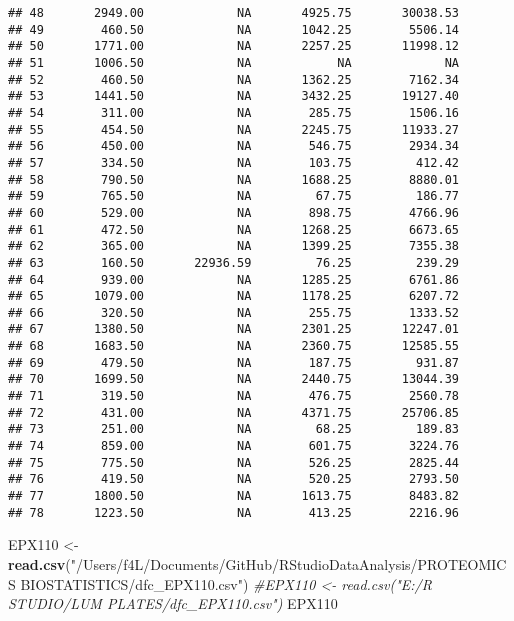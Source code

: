 \documentclass[]{article}
\newenvironment{Shaded}{\begin{snugshade}}{\end{snugshade}}
\newcommand{\CommentTok}[1]{\textcolor[rgb]{0.56,0.35,0.01}{\textit{#1}}}
\newcommand{\KeywordTok}[1]{\textcolor[rgb]{0.13,0.29,0.53}{\textbf{#1}}}
\newcommand{\NormalTok}[1]{#1}
\newcommand{\StringTok}[1]{\textcolor[rgb]{0.31,0.60,0.02}{#1}}
\begin{document}
\begin{verbatim}
## 48       2949.00             NA       4925.75       30038.53
## 49        460.50             NA       1042.25        5506.14
## 50       1771.00             NA       2257.25       11998.12
## 51       1006.50             NA            NA             NA
## 52        460.50             NA       1362.25        7162.34
## 53       1441.50             NA       3432.25       19127.40
## 54        311.00             NA        285.75        1506.16
## 55        454.50             NA       2245.75       11933.27
## 56        450.00             NA        546.75        2934.34
## 57        334.50             NA        103.75         412.42
## 58        790.50             NA       1688.25        8880.01
## 59        765.50             NA         67.75         186.77
## 60        529.00             NA        898.75        4766.96
## 61        472.50             NA       1268.25        6673.65
## 62        365.00             NA       1399.25        7355.38
## 63        160.50       22936.59         76.25         239.29
## 64        939.00             NA       1285.25        6761.86
## 65       1079.00             NA       1178.25        6207.72
## 66        320.50             NA        255.75        1333.52
## 67       1380.50             NA       2301.25       12247.01
## 68       1683.50             NA       2360.75       12585.55
## 69        479.50             NA        187.75         931.87
## 70       1699.50             NA       2440.75       13044.39
## 71        319.50             NA        476.75        2560.78
## 72        431.00             NA       4371.75       25706.85
## 73        251.00             NA         68.25         189.83
## 74        859.00             NA        601.75        3224.76
## 75        775.50             NA        526.25        2825.44
## 76        419.50             NA        520.25        2793.50
## 77       1800.50             NA       1613.75        8483.82
## 78       1223.50             NA        413.25        2216.96
\end{verbatim}

\begin{Shaded}
\begin{Highlighting}[]
\NormalTok{EPX110 <-}\StringTok{ }\KeywordTok{read.csv}\NormalTok{(}\StringTok{"/Users/f4L/Documents/GitHub/RStudioDataAnalysis/PROTEOMICS BIOSTATISTICS/dfc_EPX110.csv"}\NormalTok{)}
\CommentTok{#EPX110 <- read.csv("E:/R STUDIO/LUM PLATES/dfc_EPX110.csv")}
\NormalTok{EPX110}
\end{Highlighting}
\end{Shaded}
\end{document}
